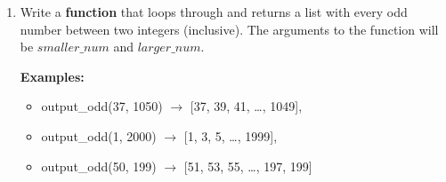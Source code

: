 \documentclass{article}
\begin{document}
\begin{enumerate}
	\item 
		Write a \textbf{function} that loops through and returns a list with every odd number between two
		integers (inclusive). The arguments to the function will be $smaller\_num$ and 
		$larger\_num$.

		\textbf{Examples:}		
		\begin{itemize}
			\item  output\_odd(37, 1050) $\rightarrow$ [37, 39, 41, \dots, 1049], 
			\item  output\_odd(1, 2000) $\rightarrow$ [1, 3, 5, \dots, 1999], 
			\item  output\_odd(50, 199) $\rightarrow$ [51, 53, 55, \dots, 197, 199]
		\end{itemize}


\end{enumerate}
\pagebreak
\end{document}
